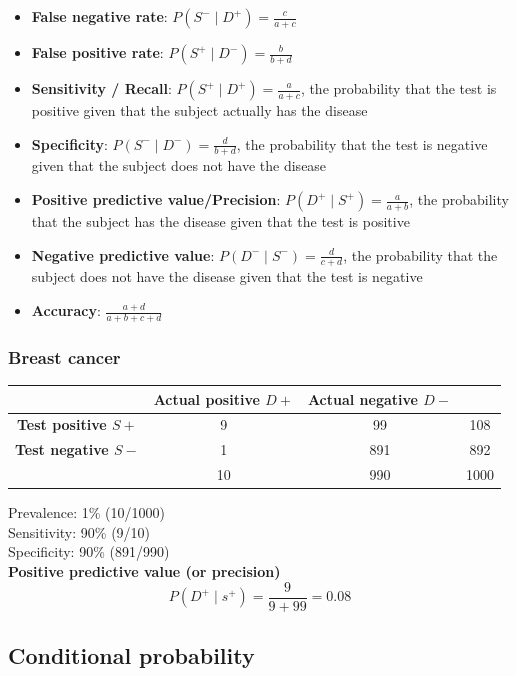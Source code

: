 \documentclass[a4paper]{article}
\begin{document}
\begin{itemize}
	\item \textbf{False negative rate}: \( P(S^- \mid D^+) = \frac{c}{a + c} \) 
	\item \textbf{False positive rate}: \( P(S^+ \mid D^-) = \frac{b}{b + d} \)
	\item \textbf{Sensitivity / Recall}: \( P(S^+ \mid D^+) = \frac{a}{a + c} \), the probability that the test is positive given that the subject actually has the disease
	\item \textbf{Specificity}: \( P(S^- \mid D^-) = \frac{d}{b + d} \), the probability that the test is negative given that the subject does not have the disease
	\item \textbf{Positive predictive value/Precision}: \( P(D^+ \mid S^+) = \frac{a}{a + b} \), the probability that the subject has the disease given that the test is positive
	\item \textbf{Negative predictive value}: \( P(D^- \mid S^-) = \frac{d}{c + d} \), the probability that the subject does not have the disease given that the test is negative
	\item \textbf{Accuracy}: \( \frac{a + d}{a + b + c + d} \) 
\end{itemize}
\subsubsection{Breast cancer}
\begin{table}[H]
	\centering
	\begin{tabular}{@{}cccc@{}}
	\toprule
	& \textcolor{mygreen}{\textbf{Actual positive \( D+ \)}} & \textcolor{mygreen}{\textbf{Actual negative \( D- \)}} \\ \midrule
	\textcolor{myred}{\textbf{Test positive \( S+ \)}} & 9  & 99   & 108 \\
	\textcolor{myred}{\textbf{Test negative \( S- \)}} & 1  & 891  & 892 \\
													   & 10 & 990 & 1000 \\ \bottomrule
	\end{tabular}
\end{table}
Prevalence: 1\% (10/1000)\\
Sensitivity: 90\% (9/10)\\
Specificity: 90\% (891/990)\\
\textbf{Positive predictive value (or precision)}
\[
	P(D^+ \mid s^+) = \frac{9}{9+99} = 0.08
\]
\subsection{Conditional probability}
\end{document}
